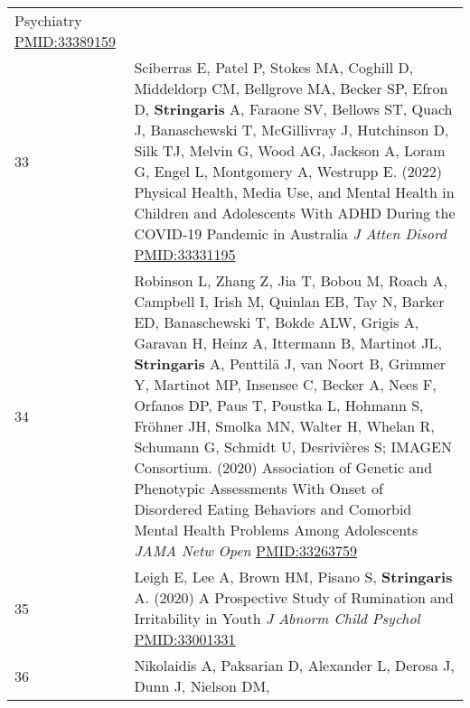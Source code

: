 \documentclass[
]{article}
\begin{document}
\begin{longtable}[]{@{}ll@{}}
\begin{minipage}[t]{0.94\columnwidth}
{Psychiatry} \url{PMID:33389159}\strut
\end{minipage}\tabularnewline
\begin{minipage}[t]{0.01\columnwidth}\raggedright
33\strut
\end{minipage} & \begin{minipage}[t]{0.94\columnwidth}\raggedright
Sciberras E, Patel P, Stokes MA, Coghill D, Middeldorp CM, Bellgrove MA,
Becker SP, Efron D, \textbf{Stringaris} A, Faraone SV, Bellows ST, Quach
J, Banaschewski T, McGillivray J, Hutchinson D, Silk TJ, Melvin G, Wood
AG, Jackson A, Loram G, Engel L, Montgomery A, Westrupp E. (2022)
Physical Health, Media Use, and Mental Health in Children and
Adolescents With ADHD During the COVID-19 Pandemic in Australia \emph{J
Atten Disord} \url{PMID:33331195}\strut
\end{minipage}\tabularnewline
\begin{minipage}[t]{0.01\columnwidth}\raggedright
34\strut
\end{minipage} & \begin{minipage}[t]{0.94\columnwidth}\raggedright
Robinson L, Zhang Z, Jia T, Bobou M, Roach A, Campbell I, Irish M,
Quinlan EB, Tay N, Barker ED, Banaschewski T, Bokde ALW, Grigis A,
Garavan H, Heinz A, Ittermann B, Martinot JL, \textbf{Stringaris} A,
Penttilä J, van Noort B, Grimmer Y, Martinot MP, Insensee C, Becker A,
Nees F, Orfanos DP, Paus T, Poustka L, Hohmann S, Fröhner JH, Smolka MN,
Walter H, Whelan R, Schumann G, Schmidt U, Desrivières S; IMAGEN
Consortium. (2020) Association of Genetic and Phenotypic Assessments
With Onset of Disordered Eating Behaviors and Comorbid Mental Health
Problems Among Adolescents \emph{JAMA Netw Open}
\url{PMID:33263759}\strut
\end{minipage}\tabularnewline
\begin{minipage}[t]{0.01\columnwidth}\raggedright
35\strut
\end{minipage} & \begin{minipage}[t]{0.94\columnwidth}\raggedright
Leigh E, Lee A, Brown HM, Pisano S, \textbf{Stringaris} A. (2020) A
Prospective Study of Rumination and Irritability in Youth \emph{J Abnorm
Child Psychol} \url{PMID:33001331}\strut
\end{minipage}\tabularnewline
\begin{minipage}[t]{0.01\columnwidth}\raggedright
36\strut
\end{minipage} & \begin{minipage}[t]{0.94\columnwidth}\raggedright
Nikolaidis A, Paksarian D, Alexander L, Derosa J, Dunn J, Nielson DM,

\end{minipage}
\end{longtable}
\end{document}
